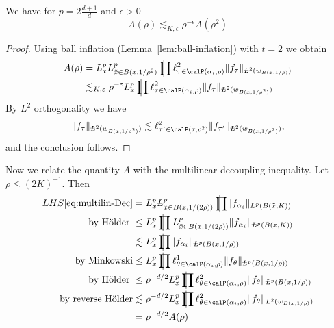 \begin{proposition}
\label{prop:iter:low-p}
We have for $p = 2 \frac{d+1}{d}$ and $\epsilon>0$
\begin{equation}
\label{eq:iter:low-p}
A(\rho)
\lesssim_{K,\epsilon}
\rho^{-\epsilon} A(\rho^{2})
\end{equation}
\end{proposition}
\begin{proof}
Using ball inflation (Lemma~\ref{lem:ball-inflation}) with $t=2$ we obtain
\begin{align*}
A(\rho)
&=
L^{p}_{x} \avL^{p}_{\tilde{x} \in B(x,1/\rho^{2})} \avprod \ell^{2}_{\tau\in \Part[\alpha_i]{\rho}} \norm{f_{\tau}}_{\avL^{2}(w_{B(\tilde{x},1/\rho)})}\\
&\lesssim_{K,\epsilon} \rho^{-\epsilon}
L^{p}_{x} \avprod \ell^{2}_{\tau\in \Part[\alpha_i]{\rho}} \norm{f_{\tau}}_{\avL^{2}(w_{B(x,1/\rho^{2})})}
\end{align*}
By $L^{2}$ orthogonality we have
\begin{equation}\label{eq:L2-orth-scale-rho^2}
\norm{f_{\tau}}_{\avL^{2}(w_{B(x,1/\rho^{2})})}
\lesssim
\ell^{2}_{\tau' \in \Part[\tau]{\rho^{2}}}\norm{f_{\tau'}}_{\avL^{2}(w_{B(x,1/\rho^{2})})},
\end{equation}
and the conclusion follows.
\end{proof}
Now we relate the quantity $A$ with the multilinear decoupling inequality.
Let $\rho \leq (2K)^{-1}$.
Then
\begin{equation}\label{eq:triv-est-by-A}
\begin{split}
LHS\eqref{eq:multilin-Dec}
&=
L^{p}_{x} \avL^{p}_{\tilde{x} \in B(x,1/(2\rho))} \avprod \norm{f_{\alpha_i}}_{\avL^p(B(\tilde{x},K))}\\
\text{by H\"older }&\leq
L^{p}_{x} \avprod \avL^{p}_{\tilde{x} \in B(x,1/(2\rho))} \norm{f_{\alpha_i}}_{\avL^p(B(\tilde{x},K))}\\
&\lesssim
L^{p}_{x} \avprod \norm{f_{\alpha_i}}_{\avL^p(B(x,1/\rho))}\\
\text{by Minkowski}&\leq
L^{p}_{x} \avprod \ell^{1}_{\theta\in\Part[\alpha_i]{\rho}} \norm{f_{\theta}}_{\avL^p(B(x,1/\rho))} \\
\text{by H\"older }&\leq
\rho^{-d/2}
L^{p}_{x} \avprod \ell^{2}_{\theta\in\Part[\alpha_i]{\rho}} \norm{f_{\theta}}_{\avL^p(B(x,1/\rho))}\\
\text{by reverse H\"older}&\lesssim
\rho^{-d/2}
L^{p}_{x} \avprod \ell^{2}_{\theta\in\Part[\alpha_i]{\rho}} \norm{f_{\theta}}_{\avL^2(w_{B(x,1/\rho)})}\\
&=
\rho^{-d/2}
A(\rho)
\end{split}
\end{equation}
